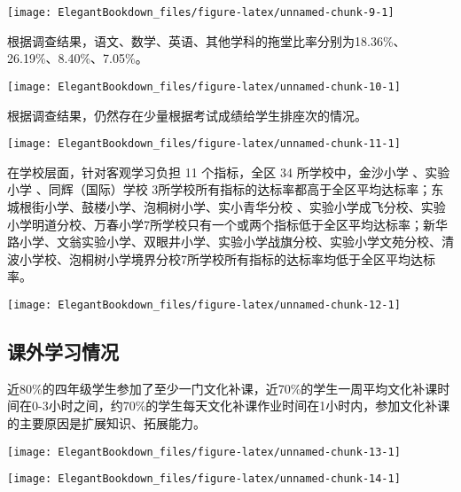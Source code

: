 \documentclass[cn, 11pt, fancy, hide]{elegantbook}
\begin{document}
\begin{center}\texttt{[image: ElegantBookdown\_files/figure-latex/unnamed-chunk-9-1]} \end{center}

根据调查结果，语文、数学、英语、其他学科的拖堂比率分别为18.36\%、26.19\%、8.40\%、7.05\%。

\begin{center}\texttt{[image: ElegantBookdown\_files/figure-latex/unnamed-chunk-10-1]} \end{center}

根据调查结果，仍然存在少量根据考试成绩给学生排座次的情况。

\begin{center}\texttt{[image: ElegantBookdown\_files/figure-latex/unnamed-chunk-11-1]} \end{center}

在学校层面，针对客观学习负担 11 个指标，全区 34 所学校中，金沙小学 、实验小学 、同辉（国际）学校 3所学校所有指标的达标率都高于全区平均达标率；东城根街小学、鼓楼小学、泡桐树小学、实小青华分校 、实验小学成飞分校、实验小学明道分校、万春小学7所学校只有一个或两个指标低于全区平均达标率；新华路小学、文翁实验小学、双眼井小学、实验小学战旗分校、实验小学文苑分校、清波小学校、泡桐树小学境界分校7所学校所有指标的达标率均低于全区平均达标率。

\begin{center}\texttt{[image: ElegantBookdown\_files/figure-latex/unnamed-chunk-12-1]} \end{center}

\hypertarget{section-4}{%
\subsection{课外学习情况}\label{section-4}}

近80\%的四年级学生参加了至少一门文化补课，近70\%的学生一周平均文化补课时间在0-3小时之间，约70\%的学生每天文化补课作业时间在1小时内，参加文化补课的主要原因是扩展知识、拓展能力。

\begin{center}\texttt{[image: ElegantBookdown\_files/figure-latex/unnamed-chunk-13-1]} \end{center}

\begin{center}\texttt{[image: ElegantBookdown\_files/figure-latex/unnamed-chunk-14-1]} \end{center}
\end{document}
